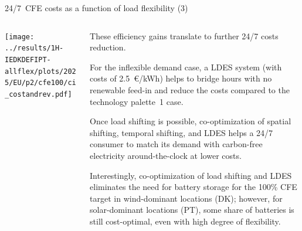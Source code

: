\begin{frame}{24/7~CFE costs as a function of load flexibility (3)}

  {\footnotesize
  \vspace{0.2cm}
  
  \begin{columns}[T]

  \begin{column}{9cm}
  \centering
  \texttt{[image: ../results/1H-IEDKDEFIPT-allflex/plots/2025/EU/p2/cfe100/ci\_costandrev.pdf]}
  \end{column}

  \begin{column}{6cm}
  These efficiency gains translate to further 24/7 costs reduction.
  
  \vspace{0.1cm} 
  For the inflexible demand case, a LDES system (with costs of 2.5~€/kWh) helps to bridge hours with no renewable feed-in and reduce the costs compared to the technology palette~1 case. 

  \vspace{0.1cm} 
  Once load shifting is possible, co-optimization of spatial shifting, temporal shifting, and LDES helps a 24/7 consumer to match its demand with carbon-free electricity around-the-clock at lower costs.

  \vspace{0.1cm} 
  Interestingly, co-optimization of load shifting and LDES eliminates the need for battery storage for the 100\% CFE target in wind-dominant locations (DK); however, for solar-dominant locations (PT), some share of batteries is still cost-optimal, even with high degree of flexibility.

  \end{column}
  \end{columns}
  }
\end{frame}



